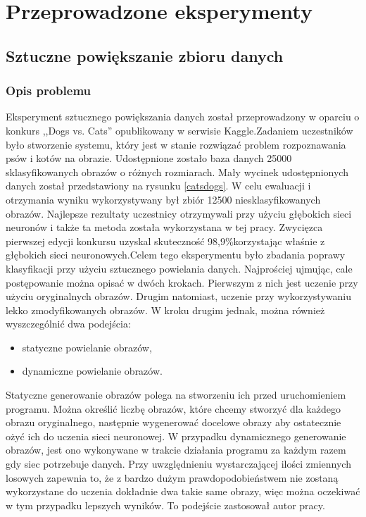 \section{Przeprowadzone eksperymenty} \label{results}


\subsection{Sztuczne powiększanie zbioru danych}
\subsubsection{Opis problemu}
Eksperyment sztucznego powiększania danych został przeprowadzony w oparciu o konkurs ,,Dogs vs. Cats'' opublikowany w serwisie Kaggle.\footnotemark Zadaniem uczestników było stworzenie systemu, który jest w stanie rozwiązać problem rozpoznawania psów i kotów na obrazie. Udostępnione zostało baza danych 25000 sklasyfikowanych obrazów o różnych rozmiarach. Mały wycinek udostępnionych danych został przedstawiony na rysunku \ref{catsdogs}. W celu ewaluacji i otrzymania wyniku wykorzystywany był zbiór 12500 niesklasyfikowanych obrazów. Najlepsze rezultaty uczestnicy otrzymywali przy użyciu głębokich sieci neuronów i także ta metoda została wykorzystana w tej pracy. Zwycięzca pierwszej edycji konkursu uzyskal skuteczność 98,9\%\footnotemark korzystając właśnie z głębokich sieci neuronowych.Celem tego eksperymentu było zbadania poprawy klasyfikacji przy użyciu sztucznego powielania danych. Najprościej ujmując, cale postępowanie można opisać w dwóch krokach. Pierwszym z nich jest uczenie przy użyciu oryginalnych obrazów. Drugim natomiast, uczenie przy wykorzystywaniu lekko zmodyfikowanych obrazów. W kroku drugim jednak, można również wyszczególnić dwa podejścia:
\begin{itemize}
\item statyczne powielanie obrazów,
\item dynamiczne powielanie obrazów.
\end{itemize}
Statyczne generowanie obrazów polega na stworzeniu ich przed uruchomieniem programu. Można określić liczbę obrazów, które chcemy stworzyć dla każdego obrazu oryginalnego, następnie wygenerować docelowe obrazy aby ostatecznie ożyć ich do uczenia sieci neuronowej. W przypadku dynamicznego generowanie obrazów, jest ono wykonywane w trakcie działania programu za każdym razem gdy siec potrzebuje danych. Przy uwzględnieniu wystarczającej ilości zmiennych losowych zapewnia to, że z bardzo dużym prawdopodobieństwem nie zostaną wykorzystane do uczenia dokładnie dwa takie same obrazy, więc można oczekiwać w tym przypadku lepszych wyników. To podejście zastosował autor pracy.

